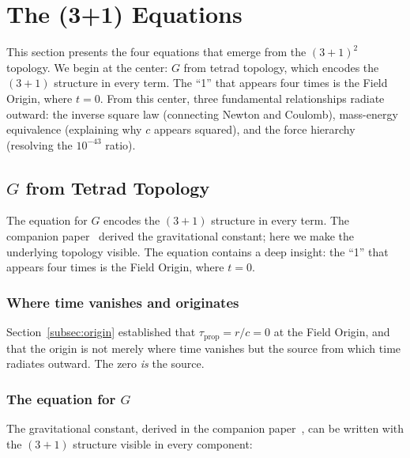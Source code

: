 \documentclass[aps,prd,preprint,superscriptaddress,showpacs,preprintnumbers,amsmath,amssymb,nofootinbib]{revtex4-2}
\begin{document}
\section{The (3+1) Equations}
\label{sec:five}

This section presents the four equations that emerge from the $(3+1)^2$ topology. We begin at the center: $G$ from tetrad topology, which encodes the $(3+1)$ structure in every term. The ``1'' that appears four times is the Field Origin, where $t = 0$. From this center, three fundamental relationships radiate outward: the inverse square law (connecting Newton and Coulomb), mass-energy equivalence (explaining why $c$ appears squared), and the force hierarchy (resolving the $10^{-43}$ ratio).

\subsection{$G$ from Tetrad Topology}
\label{subsec:master-eq}

The equation for $G$ encodes the $(3+1)$ structure in every term. The companion paper~\cite{paper6} derived the gravitational constant; here we make the underlying topology visible. The equation contains a deep insight: the ``1'' that appears four times is the Field Origin, where $t = 0$.

\subsubsection*{Where time vanishes and originates}

Section~\ref{subsec:origin} established that $\tau_{\text{prop}} = r/c = 0$ at the Field Origin, and that the origin is not merely where time vanishes but the source from which time radiates outward. The zero \emph{is} the source.

\subsubsection*{The equation for $G$}

The gravitational constant, derived in the companion paper~\cite{paper6}, can be written with the $(3+1)$ structure visible in every component:
\end{document}
